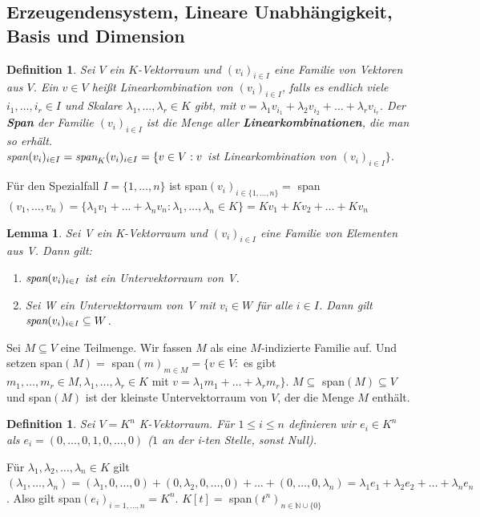 \documentclass[12pt,a4paper]{article}
\theoremstyle{plain}
\newtheorem{Lemma}[Theorem]{Lemma}
\newtheorem{Definition}[Theorem]{Definition}
\newcommand{\herv}[1]{{\emph{\textbf{#1}}}}
\newcommand{\N}{\mathbb{N}}
\numberwithin{equation}{section}
\begin{document}
\subsection{Erzeugendensystem, Lineare Unabhängigkeit, Basis und Dimension}
\begin{Definition}
Sei $V$ ein $K$-Vektorraum und $(v_i)_{i\in I}$ eine Familie von Vektoren aus $V$. Ein $v\in V$ heißt Linearkombination von $(v_i)_{i\in I}$, falls es endlich viele $i_1,\ldots,i_r\in I$ und Skalare $\lambda_1,\ldots,\lambda_r\in K$ gibt, mit $v=\lambda_1 v_{i_1}+\lambda_2 v_{i_2}+\ldots+\lambda_r v_{i_r}$. Der \herv{Span} der Familie $(v_i)_{i\in I}$ ist die Menge aller \herv{Linearkombinationen}, die man so erhält.\\
\emph{span}$(v_i)_{i\in I} = \emph{span}_K(v_i)_{i\in I}= \{v\in V: v$ ist Linearkombination von $(v_i)_{i\in I} \}$. 
\end{Definition}
Für den Spezialfall $I=\{1,\ldots,n\}$ ist span$(v_i)_{i\in \{1,\ldots,n\}}=$ span$(v_1,\ldots,v_n)=\{\lambda_1 v_1 + \ldots + \lambda_n v_n : \lambda_1,\ldots,\lambda_n\in K\}=Kv_1+Kv_2+\ldots+Kv_n$
\begin{Lemma}
Sei V ein K-Vektorraum und $(v_i)_{i\in I}$ eine Familie von Elementen aus V. Dann gilt:
\begin{enumerate}
\renewcommand{\labelenumi}{\emph{\alph{enumi})}}
\item $\emph{span}(v_i)_{i\in I}$ ist ein Untervektorraum von V.
\item Sei W ein Untervektorraum von V mit $v_i\in W$ für alle $i\in I$. Dann gilt $\emph{span}(v_i)_{i\in I}\subseteq W$.
\end{enumerate}
\end{Lemma}
Sei $M\subseteq V$ eine Teilmenge. Wir fassen $M$ als eine $M$-indizierte Familie auf. Und setzen span$(M)=$ span$(m)_{m\in M}=\{v\in V:$ es gibt $m_1,\ldots,m_r\in M, \lambda_1,\ldots,\lambda_r\in K$ mit $v=\lambda_1m_1+\ldots+\lambda_rm_r\}$. $M\subseteq$ span$(M)\subseteq V$ und span$(M)$ ist der kleinste Untervektorraum von $V$, der die Menge $M$ enthält.
\begin{Definition}
Sei $V=K^n$ K-Vektorraum. Für $1\leq i\leq n$ definieren wir $e_i\in K^n$ als $e_i=(0,\ldots,0,1,0,\ldots,0)$ ($1$ an der i-ten Stelle, sonst Null).
\end{Definition}
Für $\lambda_1,\lambda_2,\ldots,\lambda_n\in K$ gilt $(\lambda_1,\ldots,\lambda_n)=(\lambda_1,0,\ldots,0)+(0,\lambda_2,0,\ldots,0)+\ldots+(0,\ldots,0,\lambda_n)=\lambda_1e_1+\lambda_2e_2+\ldots+\lambda_ne_n$. Also gilt span$(e_i)_{i=1,\ldots,n}=K^n$. $K[t]=$ span$(t^n)_{n\in\N\cup \{0\}}$ \\
\end{document}
